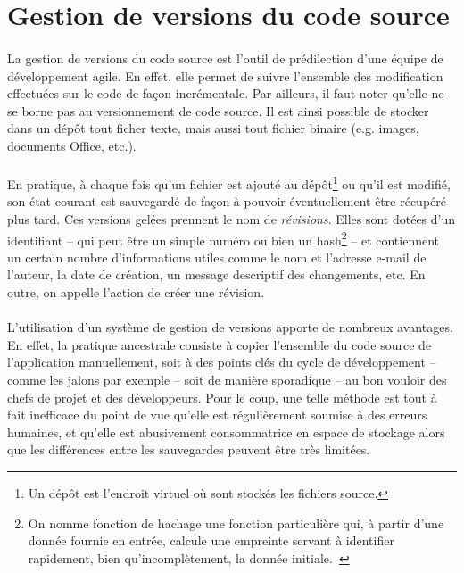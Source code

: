 \section{Gestion de versions du code source}
\label{section:pic-source}

\paragraph{}
La gestion de versions du code source est l'outil de prédilection d'une équipe de développement agile.
En effet, elle permet de suivre l'ensemble des modification effectuées sur le code de façon incrémentale.
Par ailleurs, il faut noter qu'elle ne se borne pas au versionnement de code source.
Il est ainsi possible de stocker dans un dépôt tout ficher texte, mais aussi tout fichier binaire (e.g. images, documents Office, etc.).

\paragraph{}
En pratique, à chaque fois qu'un fichier est ajouté au dépôt\footnote{Un dépôt est l'endroit virtuel où sont stockés les fichiers source.} ou qu'il est modifié, son état courant est sauvegardé de façon à pouvoir éventuellement être récupéré plus tard.
Ces versions gelées prennent le nom de \emph{révisions}.
Elles sont dotées d'un identifiant -- qui peut être un simple numéro ou bien un hash\footnote{On nomme fonction de hachage une fonction particulière qui, à partir d'une donnée fournie en entrée, calcule une empreinte servant à identifier rapidement, bien qu'incomplètement, la donnée initiale.~\cite{hash}} -- et contiennent un certain nombre d'informations utiles comme le nom et l'adresse e-mail de l'auteur, la date de création, un message descriptif des changements, etc.
En outre, on appelle \acommit{} l'action de créer une révision.

\paragraph{}
L'utilisation d'un système de gestion de versions apporte de nombreux avantages.
En effet, la pratique ancestrale consiste à copier l'ensemble du code source de l'application manuellement, soit à des points clés du cycle de développement -- comme les jalons par exemple -- soit de manière sporadique -- au bon vouloir des chefs de projet et des développeurs.
Pour le coup, une telle méthode est tout à fait inefficace du point de vue qu'elle est régulièrement soumise à des erreurs humaines, et qu'elle est abusivement consommatrice en espace de stockage alors que les différences entre les sauvegardes peuvent être très limitées.


